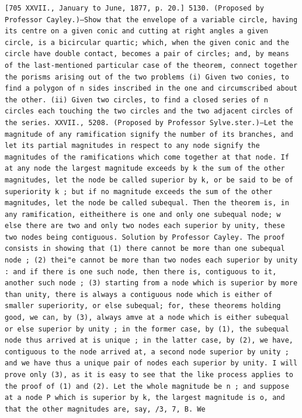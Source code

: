 \documentclass[11pt,a4paper]{book}
\begin{document}
\newpage
\setcounter{page}{598}
\begin{verbatim}
[705 XXVII., January to June, 1877, p. 20.] 5130. (Proposed by Professor Cayley.)—Show that the envelope of a variable circle, having its centre on a given conic and cutting at right angles a given circle, is a bicircular quartic; which, when the given conic and the circle have double contact, becomes a pair of circles; and, by means of the last-mentioned particular case of the theorem, connect together the porisms arising out of the two problems (i) Given two conies, to find a polygon of n sides inscribed in the one and circumscribed about the other. (ii) Given two circles, to find a closed series of n circles each touching the two circles and the two adjacent circles of the series. XXVII., 5208. (Proposed by Professor Sylve.ster.)—Let the magnitude of any ramification signify the number of its branches, and let its partial magnitudes in respect to any node signify the magnitudes of the ramifications which come together at that node. If at any node the largest magnitude exceeds by k the sum of the other magnitudes, let the node be called superior by k, or be said to be of superiority k ; but if no magnitude exceeds the sum of the other magnitudes, let the node be called subequal. Then the theorem is, in any ramification, eitheithere is one and only one subequal node; w else there are two and only two nodes each superior by unity, these two nodes being contiguous. Solution by Professor Cayley. The proof consists in showing that (1) there cannot be more than one subequal node ; (2) thei"e cannot be more than two nodes each superior by unity : and if there is one such node, then there is, contiguous to it, another such node ; (3) starting from a node which is superior by more than unity, there is always a contiguous node which is either of smaller superiority, or else subequal; for, these theorems holding good, we can, by (3), always amve at a node which is either subequal or else superior by unity ; in the former case, by (1), the subequal node thus arrived at is unique ; in the latter case, by (2), we have, contiguous to the node arrived at, a second node superior by unity ; and we have thus a unique pair of nodes each superior by unity. I will prove only (3), as it is easy to see that the like process applies to the proof of (1) and (2). Let the whole magnitude be n ; and suppose at a node P which is superior by k, the largest magnitude is o, and that the other magnitudes are, say, /3, 7, B. We 
\end{verbatim}
\end{document}
